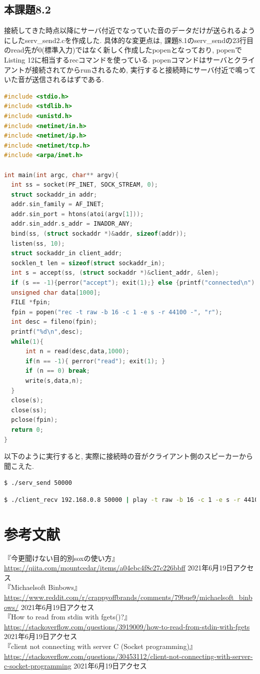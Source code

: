 \documentclass{ltjsarticle}
\begin{document}
\subsection*{本課題8.2}
接続してきた時点以降にサーバ付近でなっていた音のデータだけが送られるようにしたserv\_send2.cを作成した. 具体的な変更点は, 課題8.1のserv\_sendの23行目のread先が0(標準入力)ではなく新しく作成したpopenとなっており, popenでListing 12に相当するrecコマンドを使っている. popenコマンドはサーバとクライアントが接続されてからrunされるため, 実行すると接続時にサーバ付近で鳴っていた音が送信されるはずである. 　
\begin{lstlisting}[caption=serv\_send2.c,language=C]
#include <stdio.h>
#include <stdlib.h>
#include <unistd.h>
#include <netinet/in.h>
#include <netinet/ip.h>
#include <netinet/tcp.h>
#include <arpa/inet.h>

int main(int argc, char** argv){
  int ss = socket(PF_INET, SOCK_STREAM, 0);
  struct sockaddr_in addr;
  addr.sin_family = AF_INET;
  addr.sin_port = htons(atoi(argv[1]));
  addr.sin_addr.s_addr = INADDR_ANY;
  bind(ss, (struct sockaddr *)&addr, sizeof(addr));
  listen(ss, 10);
  struct sockaddr_in client_addr;
  socklen_t len = sizeof(struct sockaddr_in);
  int s = accept(ss, (struct sockaddr *)&client_addr, &len);
  if (s == -1){perror("accept"); exit(1);} else {printf("connected\n");}
  unsigned char data[1000];
  FILE *fpin;
  fpin = popen("rec -t raw -b 16 -c 1 -e s -r 44100 -", "r");
  int desc = fileno(fpin);
  printf("%d\n",desc);
  while(1){
      int n = read(desc,data,1000);
      if(n == -1){ perror("read"); exit(1); }
      if (n == 0) break;
      write(s,data,n);
  }
  close(s);
  close(ss);
  pclose(fpin);
  return 0;
}
\end{lstlisting}
以下のように実行すると, 実際に接続時の音がクライアント側のスピーカーから聞こえた.
\begin{lstlisting}[caption=サーバ側,language=bash]
$ ./serv_send 50000
\end{lstlisting}
\begin{lstlisting}[caption=クライアント側,language=bash]
$ ./client_recv 192.168.0.8 50000 | play -t raw -b 16 -c 1 -e s -r 44100 -
\end{lstlisting}


\section*{参考文献}
『今更聞けない目的別soxの使い方』 \url{https://qiita.com/mountcedar/items/a04ebc4f8c27c226bbff} 2021年6月19日アクセス\\
『Michaelsoft Binbows』 \url{https://www.reddit.com/r/crappyoffbrands/comments/79bue9/michaelsoft_binbows/} 2021年6月19日アクセス\\
『How to read from stdin with fgets()?』 \url{https://stackoverflow.com/questions/3919009/how-to-read-from-stdin-with-fgets} 2021年6月19日アクセス\\
『client not connecting with server C (Socket programming)』 \url{https://stackoverflow.com/questions/30453112/client-not-connecting-with-server-c-socket-programming} 2021年6月19日アクセス
\end{document}
